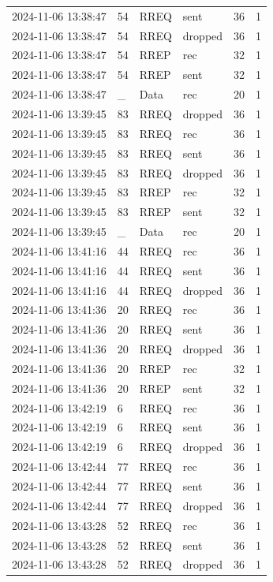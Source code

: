 \documentclass[]{nsm-thesis}
\begin{document}
\begin{longtable}{llllll}
2024-11-06 13:38:47 & 54 & RREQ & sent & 36 & 1 \\
2024-11-06 13:38:47 & 54 & RREQ & dropped & 36 & 1 \\
2024-11-06 13:38:47 & 54 & RREP & rec & 32 & 1 \\
2024-11-06 13:38:47 & 54 & RREP & sent & 32 & 1 \\
2024-11-06 13:38:47 & _ & Data & rec & 20 & 1 \\
2024-11-06 13:39:45 & 83 & RREQ & dropped & 36 & 1 \\
2024-11-06 13:39:45 & 83 & RREQ & rec & 36 & 1 \\
2024-11-06 13:39:45 & 83 & RREQ & sent & 36 & 1 \\
2024-11-06 13:39:45 & 83 & RREQ & dropped & 36 & 1 \\
2024-11-06 13:39:45 & 83 & RREP & rec & 32 & 1 \\
2024-11-06 13:39:45 & 83 & RREP & sent & 32 & 1 \\
2024-11-06 13:39:45 & _ & Data & rec & 20 & 1 \\
2024-11-06 13:41:16 & 44 & RREQ & rec & 36 & 1 \\
2024-11-06 13:41:16 & 44 & RREQ & sent & 36 & 1 \\
2024-11-06 13:41:16 & 44 & RREQ & dropped & 36 & 1 \\
2024-11-06 13:41:36 & 20 & RREQ & rec & 36 & 1 \\
2024-11-06 13:41:36 & 20 & RREQ & sent & 36 & 1 \\
2024-11-06 13:41:36 & 20 & RREQ & dropped & 36 & 1 \\
2024-11-06 13:41:36 & 20 & RREP & rec & 32 & 1 \\
2024-11-06 13:41:36 & 20 & RREP & sent & 32 & 1 \\
2024-11-06 13:42:19 & 6 & RREQ & rec & 36 & 1 \\
2024-11-06 13:42:19 & 6 & RREQ & sent & 36 & 1 \\
2024-11-06 13:42:19 & 6 & RREQ & dropped & 36 & 1 \\
2024-11-06 13:42:44 & 77 & RREQ & rec & 36 & 1 \\
2024-11-06 13:42:44 & 77 & RREQ & sent & 36 & 1 \\
2024-11-06 13:42:44 & 77 & RREQ & dropped & 36 & 1 \\
2024-11-06 13:43:28 & 52 & RREQ & rec & 36 & 1 \\
2024-11-06 13:43:28 & 52 & RREQ & sent & 36 & 1 \\
2024-11-06 13:43:28 & 52 & RREQ & dropped & 36 & 1 \\

\end{longtable}
\end{document}
